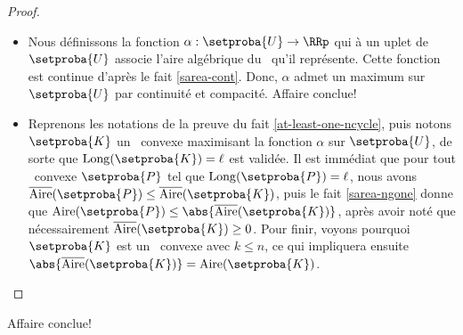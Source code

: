 \begin{proof}
\begin{itemize}
        \item Nous définissons la fonction $\alpha: \setproba{U} \rightarrow \RRp$ qui à un uplet de $\setproba{U}$ associe l'aire algébrique du \ncycle\ qu'il représente.
        Cette fonction est continue d'après le fait \ref{sarea-cont}.
        Donc, $\alpha$ admet un maximum sur $\setproba{U}$ par continuité et compacité. Affaire conclue!
        
        
        \item Reprenons les notations de la preuve du fait \ref{at-least-one-ncycle}, puis notons $\setproba{K}$ un \ncycle\ convexe maximisant la fonction $\alpha$ sur $\setproba{U}$, de sorte que $\cyclelen{\setproba{K}} = \ell$ est validée.
		Il est immédiat que pour tout \ngone\ convexe $\setproba{P}$ tel que $\cyclelen{\setproba{P}} = \ell$, nous avons $\sarea{\setproba{P}} \leq \sarea{\setproba{K}}$, puis le fait \ref{sarea-ngone} donne que $\area{\setproba{P}} \leq \abs{\sarea{\setproba{K}}}$, après avoir noté que nécessairement $\sarea{\setproba{K}} \geq 0$.
		Pour finir, voyons pourquoi $\setproba{K}$ est un \kgone\ convexe avec $k \leq n$, ce qui impliquera ensuite $\abs{\sarea{\setproba{K}}} = \area{\setproba{K}}$.
    \end{itemize}
	
	\null\vspace{-6ex}
\end{proof}

Affaire conclue!
